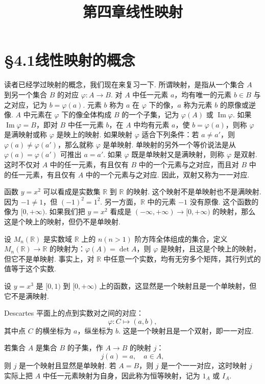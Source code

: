 \documentclass[UTF8,12pt,a4paper,fontset=fandol]{ctexart}
\title{第四章\quad 线性映射}
\author{}
\date{}
\begin{document}
\maketitle

\section*{§4.1\quad 线性映射的概念}

读者已经学过映射的概念，我们现在来复习一下. 所谓映射，是指从一个集合 $A$ 到另一个集合 $B$ 的对应 $\varphi:A\to B$. 对 $A$ 中任一元素 $a$，均有唯一的元素 $b\in B$ 与之对应，记为 $b=\varphi(a)$. 元素 $b$ 称为 $a$ 在 $\varphi$ 下的像，$a$ 称为元素 $b$ 的原像或逆像. $A$ 中元素在 $\varphi$ 下的像全体构成 $B$ 的一个子集，记为 $\varphi(A)$ 或 $\operatorname{Im}\varphi$. 如果 $\operatorname{Im}\varphi=B$，即对 $B$ 中任一元素 $b$，在 $A$ 中均有元素 $a$，使 $b=\varphi(a)$，则称 $\varphi$ 是满映射或称 $\varphi$ 是映上的映射. 如果映射 $\varphi$ 适合下列条件：若 $a\neq a'$，则 $\varphi(a)\neq\varphi(a')$，那么就称 $\varphi$ 是单映射. 单映射的另外一个等价说法是从 $\varphi(a)=\varphi(a')$ 可推出 $a=a'$. 如果 $\varphi$ 既是单映射又是满映射，则称 $\varphi$ 是双射. 这时不仅对 $A$ 中的任一元素，有且仅有 $B$ 中的一个元素与之对应，而且对 $B$ 中的任一元素，有且仅有 $A$ 中的一个元素与之对应. 因此，双射又称为一一对应.

函数 $y=x^2$ 可以看成是实数集 $\mathbb{R}$ 到 $\mathbb{R}$ 的映射. 这个映射不是单映射也不是满映射. 因为 $-1\neq 1$，但 $(-1)^2=1^2$. 另一方面，$\mathbb{R}$ 中的元素 $-1$ 没有原像. 这个函数的像为 $[0,+\infty)$. 如果我们把 $y=x^2$ 看成是 $(-\infty,+\infty)\to[0,+\infty)$ 的映射，那么这是个映上的映射，但仍不是单映射.

设 $M_n(\mathbb{R})$ 是实数域 $\mathbb{R}$ 上的 $n(n>1)$ 阶方阵全体组成的集合，定义 $M_n(\mathbb{R})\to\mathbb{R}$ 的映射为：$\varphi(A)=\det A$，则 $\varphi$ 是映射，且这是个映上的映射，但它不是单映射. 事实上，对 $\mathbb{R}$ 中任意一个实数，均有无穷多个矩阵，其行列式的值等于这个实数.

设 $y=x^3$ 是 $[0,1)$ 到 $[0,+\infty)$ 上的函数，这显然是一个映射且是一个单映射，但它不是满映射.

Descartes 平面上的点到实数对之间的对应：
\[
\varphi:C\mapsto(a,b),
\]
其中点 $C$ 的横坐标为 $a$，纵坐标为 $b$. 这是一个映射且是一个双射，即一一对应.

若集合 $A$ 是集合 $B$ 的子集，作 $A\to B$ 的映射 $j$：
\[
j(a)=a,\quad a\in A,
\]
则 $j$ 是一个映射且显然是单映射. 若 $A=B$，则 $j$ 是一个一一对应，这时映射 $j$ 实际上把 $A$ 中任一元素映射为自身，因此称为恒等映射，记为 $1_A$ 或 $I_A$.
\end{document}
